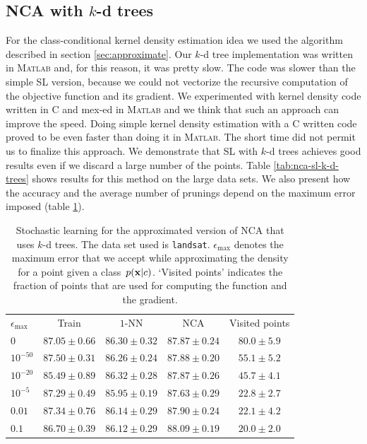 \subsection{NCA with $k$-d trees}
\label{subsec:eval-nca-k-d-trees}

For the class-conditional kernel density estimation idea we used the algorithm described in section \ref{sec:approximate}. Our $k$-d tree implementation was written in \textsc{Matlab} and, for this reason, it was pretty slow. The code was slower than the simple SL version, because we could not vectorize the recursive computation of the objective function and its gradient. We experimented with kernel density code written in C and mex-ed in \textsc{Matlab} and we think that such an approach can improve the speed. Doing simple kernel density estimation with a C written code proved to be even faster than doing it in \textsc{Matlab}. The short time did not permit us to finalize this approach. We demonstrate that SL with $k$-d trees achieves good results even if we discard a large number of the points. Table \ref{tab:nca-sl-k-d-trees} shows results for this method on the large data sets. We also present how the accuracy and the average number of prunings depend on the maximum error imposed (table \ref{tab:nca-sl-k-d-trees-landsat}). 

\begin{table}
  \centering
 	\begin{tabular}{lcccc}
 	\toprule
 	$\epsilon_{\max}$ & Train & $1$-NN & NCA & Visited points\\
 	\cmidrule(r){2-2}\cmidrule(r){3-4}\cmidrule(r){5-5}
$0$&$87.05 \pm 0.66$&$86.30 \pm 0.32$&$87.87 \pm 0.24$&$80.0 \pm 5.9$\\
$10^{-50}$&$87.50 \pm 0.31$&$86.26 \pm 0.24$&$87.88 \pm 0.20$&$55.1 \pm 5.2$\\
$10^{-20}$&$85.49 \pm 0.89$&$86.32 \pm 0.28$&$87.87 \pm 0.26$&$45.7 \pm 4.1$\\
$10^{-5}$&$87.29 \pm 0.49$&$85.95 \pm 0.19$&$87.63 \pm 0.29$&$22.8 \pm 2.7$\\
$0.01$&$87.34 \pm 0.76$&$86.14 \pm 0.29$&$87.90 \pm 0.24$&$22.1 \pm 4.2$\\
$0.1$&$86.70 \pm 0.39$&$86.12 \pm 0.29$&$88.09 \pm 0.19$&$20.0 \pm 2.0$\\
\bottomrule
  \end{tabular}
  \caption[Accuracy for the  approximated version of NCA trained using stochastic learning on the \texttt{landsat} data set]{Stochastic learning for the approximated version of NCA that uses $k$-d trees. The data set used is \texttt{landsat}. $\epsilon_{\max}$ denotes the maximum error that we accept while approximating the density for a point given a class~$p(\mathbf{x}|c)$. `Visited points' indicates the fraction of points that are used for computing the function and the gradient.}
  \label{tab:nca-sl-k-d-trees-landsat}
\end{table}


